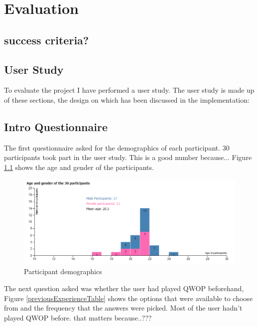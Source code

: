 \documentclass[12pt,a4paper,twoside,openright]{report}
\begin{document}
\chapter{Evaluation}
\section{success criteria?}

\section{User Study}
To evaluate the project I have performed a user study.
The user study is made up of these sections, the design on which has been discussed in the implementation:

\userStudySections

\section{Intro Questionnaire}

The first questionnaire asked for the demographics of each participant.
30 participants took part in the user study. This is a good number because...
Figure \ref{demographics} shows the age and gender of the participants.


\begin{figure}[tbh]
\centerline{\includegraphics[scale=0.7]{participantDemographics.PNG}}
\caption{Participant demographics}
\label{demographics}
\end{figure}

The next question asked was whether the user had played QWOP beforehand, Figure \ref{previousExperienceTable} shows the options that were available to choose from and the frequency that the answers were picked.
Most of the user hadn't played QWOP before.
that matters because..???
\end{document}
